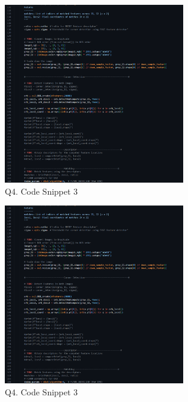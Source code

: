\documentclass{article}
\begin{document}
	\begin{figure}[H]
		\centering
		\includegraphics[width=0.7\textwidth]{./Q4_pano_cns3.png}  %
		\caption{Q4. Code Snippet 3}
		\label{fig:Q4_cns3}
	\end{figure}	
	\begin{figure}[H]
		\centering
		\includegraphics[width=0.7\textwidth]{./Q4_pano_cns3.png}  %
		\caption{Q4. Code Snippet 3}
		\label{fig:Q4_cns3}
	\end{figure}

	
\end{document}
